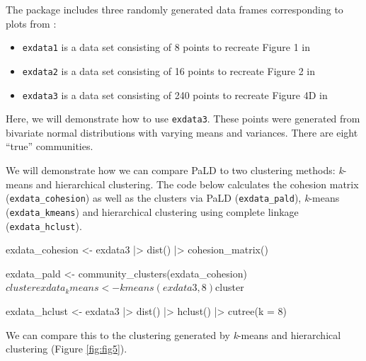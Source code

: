 The  package includes three randomly generated data frames
corresponding to plots from \citet{berenhaut2022social}:

\begin{itemize}
\tightlist
\item
  \texttt{exdata1} is a data set consisting of 8 points to recreate
  Figure 1 in \citet{berenhaut2022social}
\item
  \texttt{exdata2} is a data set consisting of 16 points to recreate
  Figure 2 in \citet{berenhaut2022social}
\item
  \texttt{exdata3} is a data set consisting of 240 points to recreate
  Figure 4D in \citet{berenhaut2022social}
\end{itemize}

Here, we will demonstrate how to use \texttt{exdata3}. These points were
generated from bivariate normal distributions with varying means and
variances. There are eight ``true'' communities.

We will demonstrate how we can compare PaLD to two clustering methods:
\emph{k}-means and hierarchical clustering. The code below calculates
the cohesion matrix (\texttt{exdata\_cohesion}) as well as the clusters
via PaLD (\texttt{exdata\_pald}), \emph{k}-means
(\texttt{exdata\_kmeans}) and hierarchical clustering using complete
linkage (\texttt{exdata\_hclust}).

\begin{Schunk}
\begin{Sinput}
exdata_cohesion <- exdata3 |>
  dist() |>
  cohesion_matrix()

exdata_pald <- community_clusters(exdata_cohesion)$cluster

exdata_kmeans <- kmeans(exdata3, 8)$cluster

exdata_hclust <- exdata3 |>
  dist() |>
  hclust() |>
  cutree(k = 8) 
\end{Sinput}
\end{Schunk}

We can compare this to the clustering generated by \emph{k}-means and
hierarchical clustering (Figure \ref{fig:fig5}).


